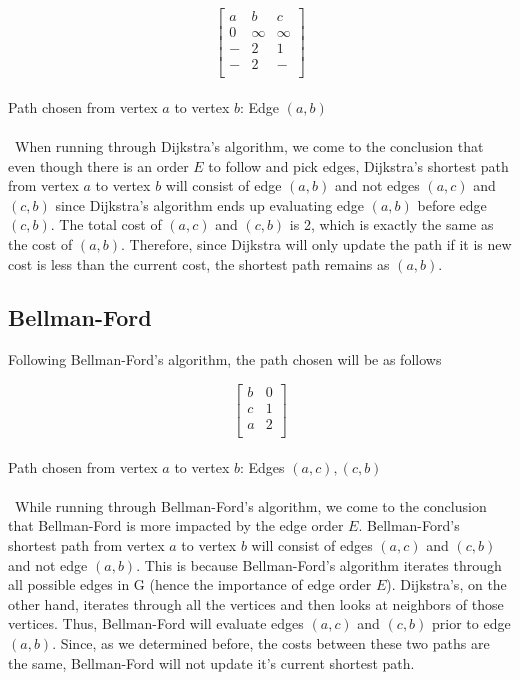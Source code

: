 \documentclass{article}
\theoremstyle{definition}
\theoremstyle{remark}
\theoremstyle{plain}
\begin{document}
 \begin{equation*}
	\begin{bmatrix}
	         a & b & c \\
		0 & \infty & \infty\\
		- & 2 & 1 \\
		- & 2 & - \\	
	\end{bmatrix}
\end{equation*}
\\
Path chosen from vertex $a$ to vertex $b$: Edge $(a,b)$\\\\\
When running through Dijkstra's algorithm, we come to the conclusion that even though there is an order $E$ to follow and pick edges, Dijkstra's shortest path from vertex $a$ to vertex $b$ will consist of edge $(a,b)$ and not edges $(a,c)$ and $(c,b)$ since Dijkstra's algorithm ends up evaluating edge $(a,b)$ before edge $(c,b)$. The total cost of $(a,c)$ and $(c,b)$ is 2, which is exactly the same as the cost of $(a,b)$. Therefore, since Dijkstra will only update the path if it is new cost is less than the current cost, the shortest path remains as $(a,b)$.

 \subsection*{Bellman-Ford}
Following Bellman-Ford's algorithm, the path chosen will be as follows

 \begin{equation*}
	\begin{bmatrix}
	         b & 0 \\
		c &1 \\
		a & 2 \\
	\end{bmatrix}
\end{equation*}
\\
Path chosen from vertex $a$ to vertex $b$: Edges $(a,c), (c,b)$\\\\\
While running through Bellman-Ford's algorithm, we come to the conclusion that Bellman-Ford is more impacted by the edge order $E$. Bellman-Ford's shortest path from vertex $a$ to vertex $b$ will consist of edges $(a,c)$ and $(c,b)$ and not edge $(a,b)$. This is because Bellman-Ford's algorithm iterates through all possible edges in G (hence the importance of edge order $E$). Dijkstra's, on the other hand, iterates through all the vertices and then looks at neighbors of those vertices. Thus, Bellman-Ford will evaluate edges $(a,c)$ and $(c,b)$ prior to edge $(a,b)$. Since, as we determined before, the costs between these two paths are the same, Bellman-Ford will not update it's current shortest path.
\end{document}
